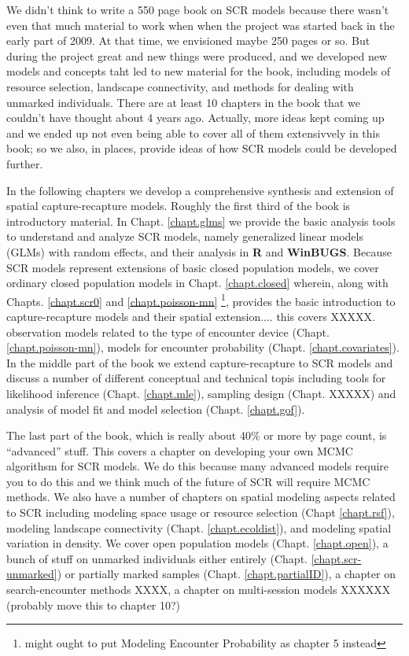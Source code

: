 We didn't think to write a 550 page book on SCR models because there
wasn't even that much material to work when when the project was
started back in the early part of 2009. At that time, we envisioned
maybe 250 pages or so. But during the project great and new things
were produced, and we developed new models and concepts taht led to
new material for the book, including models of resource selection,
landscape connectivity, and methods for dealing with unmarked
individuals. There are at least 10 chapters in the book that we
couldn't have thought about 4 years ago. Actually, more ideas kept
coming up and we ended up not even being able to cover all of them
extensivvely in this book; so we also, in places, provide ideas of how
SCR models could be developed further.

In the following chapters we develop a comprehensive synthesis and
extension of spatial capture-recapture models.  Roughly the first
third of the book is introductory material. In Chapt. \ref{chapt.glms}
we provide the basic analysis tools to understand and analyze SCR
models, namely generalized linear models (GLMs) with random effects,
and their analysis in {\bf R} and {\bf WinBUGS}.  Because SCR models
represent extensions of basic closed population models, we cover
ordinary closed population models in Chapt. \ref{chapt.closed}
wherein, along with Chapts. \ref{chapt.scr0} and
\ref{chapt.poisson-mn} \footnote{might ought to put Modeling Encounter
  Probability as chapter 5 instead}, provides the basic introduction
to capture-recapture models and their spatial extension.... this
covers XXXXX.  observation models related to the type of encounter
device (Chapt. \ref{chapt.poisson-mn}), models for encounter
probability (Chapt. \ref{chapt.covariates}). In the middle part of the
book we extend capture-recapture to SCR models and discuss a number of
different conceptual and technical topis including tools for
likelihood inference (Chapt. \ref{chapt.mle}), sampling design
(Chapt. XXXXX) and analysis of model fit and model selection
(Chapt. \ref{chapt.gof}).

The last part of the book, which is really about 40\% or more by page
count, is ``advanced'' stuff. This covers a chapter on developing your
own MCMC algorithsm for SCR models. We do this because many advanced
models require you to do this and we think much of the future of SCR
will require MCMC methods.  We also have a number of chapters on
spatial modeling aspects related to SCR including modeling space usage
or resource selection (Chapt \ref{chapt.rsf}), modeling landscape
connectivity (Chapt. \ref{chapt.ecoldist}), and modeling spatial
variation in density.  We cover open population models
(Chapt. \ref{chapt.open}), a bunch of stuff on unmarked individuals
either entirely (Chapt. \ref{chapt.scr-unmarked}) or partially marked
samples (Chapt. \ref{chapt.partialID}), a chapter on search-encounter
methods XXXX, a chapter on multi-session models XXXXXX (probably move
this to chapter 10?)


